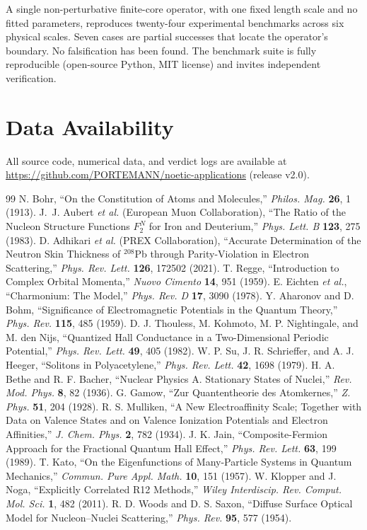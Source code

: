 \documentclass[11pt,a4paper]{article}
\begin{document}
A single non-perturbative finite-core operator, with one fixed length scale and no fitted parameters, reproduces twenty-four experimental benchmarks across six physical scales. Seven cases are partial successes that locate the operator's boundary. No falsification has been found. The benchmark suite is fully reproducible (open-source Python, MIT license) and invites independent verification.

\section*{Data Availability}

All source code, numerical data, and verdict logs are available at \url{https://github.com/PORTEMANN/noetic-applications} (release v2.0).

\begin{thebibliography}{99}
 N. Bohr, ``On the Constitution of Atoms and Molecules,'' \textit{Philos. Mag.} \textbf{26}, 1 (1913).
 J.~J. Aubert \textit{et al.} (European Muon Collaboration), ``The Ratio of the Nucleon Structure Functions $F_2^N$ for Iron and Deuterium,'' \textit{Phys. Lett. B} \textbf{123}, 275 (1983).
 D. Adhikari \textit{et al.} (PREX Collaboration), ``Accurate Determination of the Neutron Skin Thickness of $^{208}$Pb through Parity-Violation in Electron Scattering,'' \textit{Phys. Rev. Lett.} \textbf{126}, 172502 (2021).
 T. Regge, ``Introduction to Complex Orbital Momenta,'' \textit{Nuovo Cimento} \textbf{14}, 951 (1959).
 E. Eichten \textit{et al.}, ``Charmonium: The Model,'' \textit{Phys. Rev. D} \textbf{17}, 3090 (1978).
 Y. Aharonov and D. Bohm, ``Significance of Electromagnetic Potentials in the Quantum Theory,'' \textit{Phys. Rev.} \textbf{115}, 485 (1959).
 D. J. Thouless, M. Kohmoto, M. P. Nightingale, and M. den Nijs, ``Quantized Hall Conductance in a Two-Dimensional Periodic Potential,'' \textit{Phys. Rev. Lett.} \textbf{49}, 405 (1982).
 W. P. Su, J. R. Schrieffer, and A. J. Heeger, ``Solitons in Polyacetylene,'' \textit{Phys. Rev. Lett.} \textbf{42}, 1698 (1979).
 H. A. Bethe and R. F. Bacher, ``Nuclear Physics A. Stationary States of Nuclei,'' \textit{Rev. Mod. Phys.} \textbf{8}, 82 (1936).
 G. Gamow, ``Zur Quantentheorie des Atomkernes,'' \textit{Z. Phys.} \textbf{51}, 204 (1928).
 R. S. Mulliken, ``A New Electroaffinity Scale; Together with Data on Valence States and on Valence Ionization Potentials and Electron Affinities,'' \textit{J. Chem. Phys.} \textbf{2}, 782 (1934).
 J. K. Jain, ``Composite-Fermion Approach for the Fractional Quantum Hall Effect,'' \textit{Phys. Rev. Lett.} \textbf{63}, 199 (1989).
 T. Kato, ``On the Eigenfunctions of Many-Particle Systems in Quantum Mechanics,'' \textit{Commun. Pure Appl. Math.} \textbf{10}, 151 (1957).
 W. Klopper and J. Noga, ``Explicitly Correlated R12 Methods,'' \textit{Wiley Interdiscip. Rev. Comput. Mol. Sci.} \textbf{1}, 482 (2011).
 R. D. Woods and D. S. Saxon, ``Diffuse Surface Optical Model for Nucleon--Nuclei Scattering,'' \textit{Phys. Rev.} \textbf{95}, 577 (1954).
\end{thebibliography}
\end{document}
